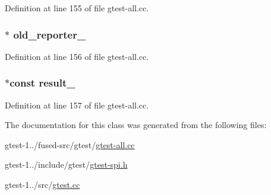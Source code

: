 \-Definition at line 155 of file gtest-\/all.\-cc.

\hypertarget{classtesting_1_1ScopedFakeTestPartResultReporter_a6931c672d50d49d040805ae729d9ac1c}{
\subsubsection[{old\-\_\-reporter\-\_\-}]{ $\ast$ {\bf old\-\_\-reporter\-\_\-}}}\label{df/d0c/classtesting_1_1ScopedFakeTestPartResultReporter_a6931c672d50d49d040805ae729d9ac1c}


\-Definition at line 156 of file gtest-\/all.\-cc.

\hypertarget{classtesting_1_1ScopedFakeTestPartResultReporter_a520bca09fbdcb2a2a36fea6b1c438b53}{
\subsubsection[{result\-\_\-}]{ $\ast$const {\bf result\-\_\-}}}\label{df/d0c/classtesting_1_1ScopedFakeTestPartResultReporter_a520bca09fbdcb2a2a36fea6b1c438b53}


\-Definition at line 157 of file gtest-\/all.\-cc.



\-The documentation for this class was generated from the following files\-:\begin{DoxyCompactItemize}
\item 
gtest-\/1../fused-\/src/gtest/\hyperlink{fused-src_2gtest_2gtest-all_8cc}{gtest-\/all.\-cc}\item 
gtest-\/1../include/gtest/\hyperlink{gtest-spi_8h}{gtest-\/spi.\-h}\item 
gtest-\/1../src/\hyperlink{gtest_8cc}{gtest.\-cc}\end{DoxyCompactItemize}
